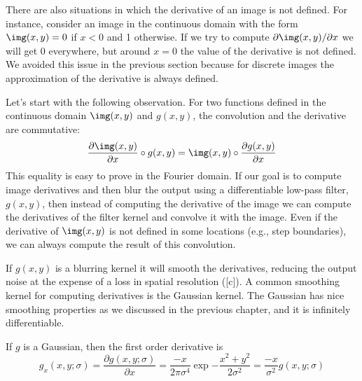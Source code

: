 There are also situations in which the derivative of an image is not defined. For instance, consider an image in the continuous domain with the form $\img (x,y) = 0$ if $x<0$ and 1 otherwise. If we try to compute $\partial \img (x,y) / \partial x$ we will get 0 everywhere, but around $x=0$ the value of the derivative is not defined. We avoided this issue in the previous section because for discrete images the approximation of the derivative is always defined. 
 
Let's start with the following observation. For two functions defined in the continuous domain $\img(x,y)$ and $g(x,y)$, the convolution and the derivative are commutative:
\begin{equation}
\frac {\partial \img(x,y)}{\partial x} \circ g(x,y) = \img(x,y) \circ \frac {\partial g(x,y)}{\partial x} 
\end{equation}
This equality is easy to prove in the Fourier domain. If our goal is to compute image derivatives and then blur the output using a differentiable low-pass filter, $g(x,y)$, then instead of computing the derivative of the image we can compute the derivatives of the filter kernel and convolve it with the image. Even if the derivative of $\img(x,y)$ is not defined in some locations (e.g., step boundaries), we can always compute the result of this convolution. 

If $g(x,y)$ is a blurring kernel it will smooth the derivatives, reducing the output noise at the expense of a loss in spatial resolution (\fig{\ref{fig:derivativesnoisystop}}[c]). A common smoothing kernel for computing derivatives is the Gaussian kernel. The Gaussian has nice smoothing properties as we discussed in the previous chapter, and it is infinitely differentiable. 

If $g$ is a Gaussian, then the first order derivative is
\begin{equation}
g_x(x,y; \sigma) = \frac {\partial g(x,y; \sigma)}{\partial x}= \frac{-x}{2 \pi \sigma^4} \exp{-\frac{x^2 +
   y^2}{2 \sigma^2}} = \frac{-x}{\sigma^2} g(x,y; \sigma)
\label{eq:derivate1gauss2dcont}
\end{equation}

